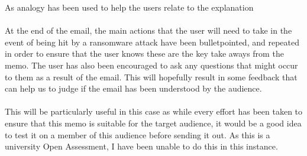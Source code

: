 \documentclass{article}
\begin{document}
As analogy has been used to help the users relate to the explanation
\\\\
At the end of the email, the main actions that the user will need to take in the event of being hit by a ransomware attack have been bulletpointed, and repeated in order to ensure that the user knows these are the key take aways from the memo.
The user has also been encouraged to ask any questions that might occur to them as a result of the email. This will hopefully result in some feedback that can help us to judge if the email has been understood by the audience.
\\\\
This will be particularly useful in this case as while every effort has been taken to ensure that this memo is suitable for the target audience, it would be a good idea to test it on a member of this audience before sending it out. As this is a university Open Assessment, I have been unable to do this in this instance.

\newpage
\raggedright
{}

\end{document}
